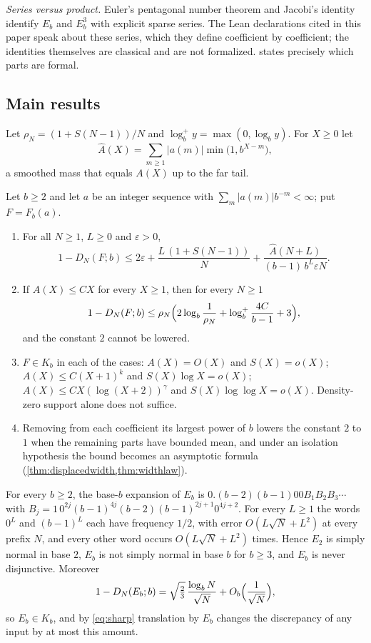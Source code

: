 \documentclass[11pt]{article}
\newcommand{\Ahat}{\widehat A}
\begin{document}
\emph{Series versus product.} Euler's pentagonal number theorem and Jacobi's
identity identify $E_b$ and $E_b^3$ with explicit sparse series. The Lean
declarations cited in this paper speak about these series, which they define
coefficient by coefficient; the identities themselves are classical
\cite{EulerE244,EulerE541,Jacobi1829,Bell2005} and are not formalized.
 states precisely which parts are formal.

\subsection{Main results}\label{subsec:main}

Let $\rho_N=(1+S(N-1))/N$ and $\log_b^+y=\max(0,\log_by)$. For $X\ge0$ let
\[
\Ahat(X)=\sum_{m\ge1}|a(m)|\min\bigl(1,b^{X-m}\bigr),
\]
a smoothed mass that
equals $A(X)$ up to the far tail.

\begin{maintheorem}\label{thm:A}
Let $b\ge2$ and let $a$ be an integer sequence with
$\sum_m|a(m)|b^{-m}<\infty$; put $F=F_b(a)$.
\begin{enumerate}[label=\textup{(\roman*)},nosep]
\item For all $N\ge1$, $L\ge0$ and $\varepsilon>0$,
\[
1-D_N(F;b)\le2\varepsilon+\frac{L\,(1+S(N-1))}{N}+\frac{\Ahat(N+L)}{(b-1)\,b^L\varepsilon N}.
\]
\item If $A(X)\le CX$ for every $X\ge1$, then for every $N\ge1$
\[
1-D_N(F;b)\le\rho_N\Bigl(2\log_b\frac1{\rho_N}+\log_b^+\frac{4C}{b-1}+3\Bigr),
\]
and the constant $2$ cannot be lowered.
\item $F\in K_b$ in each of the cases: $A(X)=O(X)$ and $S(X)=o(X)$;
$A(X)\le C(X+1)^k$ and $S(X)\log X=o(X)$; $A(X)\le CX(\log(X+2))^\gamma$ and
$S(X)\log\log X=o(X)$. Density-zero support alone does not suffice.
\item Removing from each coefficient its largest power of $b$ lowers the constant
$2$ to $1$ when the remaining parts have bounded mean, and under an isolation
hypothesis the bound becomes an asymptotic formula
(\cref{thm:displacedwidth,thm:widthlaw}).
\end{enumerate}
\end{maintheorem}

\begin{maintheorem}\label{thm:B}
For every $b\ge2$, the base-$b$ expansion of $E_b$ is
$0.(b-2)(b-1)00B_1B_2B_3\cdots$ with
$B_j=1\,0^{2j}(b-1)^{4j}(b-2)(b-1)^{2j+1}0^{4j+2}$. For every $L\ge1$ the words $0^L$
and $(b-1)^L$ each have frequency $1/2$, with error $O(L\sqrt N+L^2)$ at every
prefix $N$, and every other word occurs $O(L\sqrt N+L^2)$ times. Hence $E_2$ is
simply normal in base $2$, $E_b$ is not simply normal in base $b$ for $b\ge3$, and
$E_b$ is never disjunctive. Moreover
\[
1-D_N(E_b;b)=\sqrt{\tfrac23}\,\frac{\log_bN}{\sqrt N}+O_b\Bigl(\frac1{\sqrt N}\Bigr),
\]
so $E_b\in K_b$, and by \eqref{eq:sharp} translation by $E_b$ changes the
discrepancy of any input by at most this amount.
\end{maintheorem}
\end{document}
